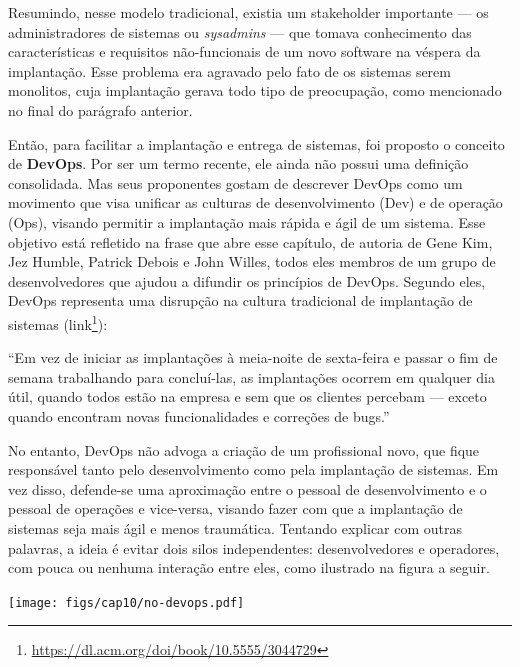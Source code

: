 \documentclass[
  11pt,
  twoside]{book}
\DeclareRobustCommand{\href}[2]{#2\footnote{\url{#1}}}
\renewenvironment{quote}{\centering \vspace{1.5ex} \begin{tcolorbox}[colback=backcolor, width=4.9in]}{\end{tcolorbox}}
\let\origfigure\figure
\let\endorigfigure\endfigure
\renewenvironment{figure}[1][2] {
    \expandafter\origfigure\expandafter[!h]
} {
    \endorigfigure
}
\begin{document}
 Resumindo, nesse modelo tradicional,
existia um stakeholder importante --- os administradores de sistemas ou
\emph{sysadmins} --- que tomava conhecimento das características e
requisitos não-funcionais de um novo software na véspera da implantação.
Esse problema era agravado pelo fato de os sistemas serem monolitos,
cuja implantação gerava todo tipo de preocupação, como mencionado no
final do parágrafo anterior.

Então, para facilitar a implantação e entrega de sistemas, foi proposto
o conceito de \textbf{DevOps}. Por ser um termo recente, ele ainda não
possui uma definição consolidada. Mas seus proponentes gostam de
descrever DevOps como um movimento que visa unificar as culturas de
desenvolvimento (Dev) e de operação (Ops), visando permitir a
implantação mais rápida e ágil de um sistema. Esse objetivo está
refletido na frase que abre esse capítulo, de autoria de Gene Kim, Jez
Humble, Patrick Debois e John Willes, todos eles membros de um grupo de
desenvolvedores que ajudou a difundir os princípios de DevOps. Segundo
eles, DevOps representa uma disrupção na cultura tradicional de
implantação de sistemas
(\href{https://dl.acm.org/doi/book/10.5555/3044729}{link}):

\begin{quote}
``Em vez de iniciar as implantações à meia-noite de sexta-feira e passar
o fim de semana trabalhando para concluí-las, as implantações ocorrem em
qualquer dia útil, quando todos estão na empresa e sem que os clientes
percebam --- exceto quando encontram novas funcionalidades e correções
de bugs.''
\end{quote}

No entanto, DevOps não advoga a criação de um profissional novo, que
fique responsável tanto pelo desenvolvimento como pela implantação de
sistemas. Em vez disso, defende-se uma aproximação entre o pessoal de
desenvolvimento e o pessoal de operações e vice-versa, visando fazer com
que a implantação de sistemas seja mais ágil e menos traumática.
Tentando explicar com outras palavras, a ideia é evitar dois silos
independentes: desenvolvedores e operadores, com pouca ou nenhuma
interação entre eles, como ilustrado na figura a seguir.

\begin{figure}
\centering
\texttt{[image: figs/cap10/no-devops.pdf]}
\caption{Organização que \textbf{não} é baseada em DevOps, pois existe
pouca comunicação entre Dev e Ops.}
\end{figure}
\end{document}
